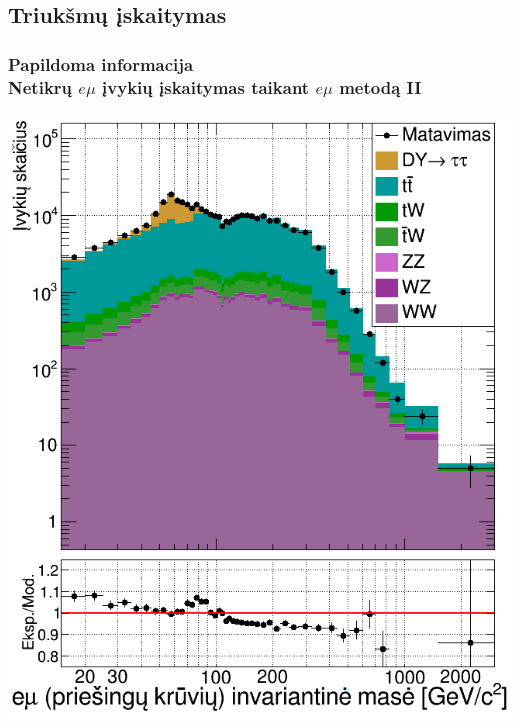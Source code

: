 \documentclass[xcolor=dvipsnames]{beamer}
\newcommand{\emu}{\mathit{e}\mu}
\begin{document}
\begin{frame}
	\section{Triukšmų įskaitymas}
	\frametitle{Papildoma informacija\\ \small Netikrų $\emu$ įvykių įskaitymas taikant $\emu$ metodą II}
	\begin{minipage}{0.44\textwidth}
		\includegraphics[width=\linewidth]{emuMassOS_SMALL.png}
	\end{minipage}
	\hfill
	\begin{minipage}{0.44\textwidth}

\end{minipage}
\end{frame}
\end{document}
